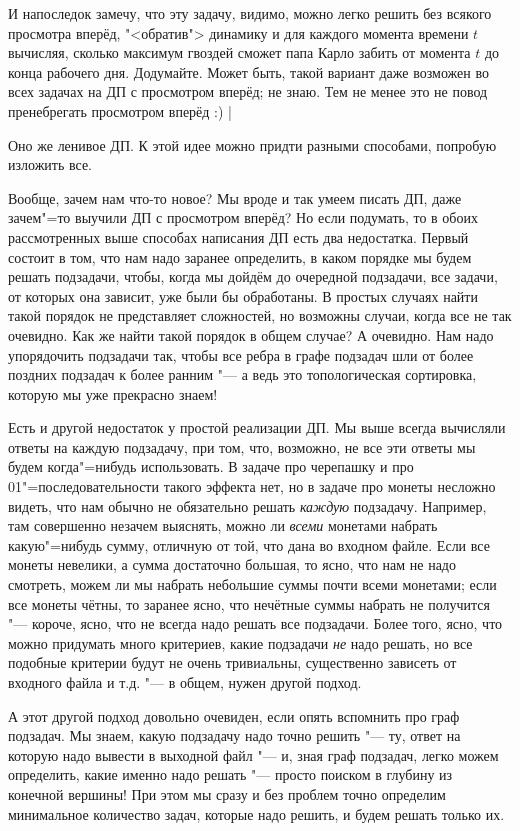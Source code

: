 И напоследок замечу, что эту задачу, видимо, можно легко решить без всякого просмотра вперёд, 
"<обратив"> динамику и для каждого момента времени $t$ вычисляя, сколько максимум гвоздей сможет 
папа Карло забить от момента $t$ до конца рабочего дня. Додумайте. Может быть, такой вариант даже 
возможен во всех задачах на ДП с просмотром вперёд; не знаю. Тем не менее это не повод пренебрегать 
просмотром вперёд :)
|\label{buratino}

 Оно же ленивое ДП.
К этой идее можно придти разными способами, попробую изложить все.

Вообще, зачем нам что-то новое? Мы вроде и так умеем писать ДП, даже зачем"=то выучили ДП с 
просмотром вперёд? Но если подумать, то в обоих рассмотренных выше способах написания ДП есть два 
недостатка. Первый состоит в том, что нам надо заранее определить, в каком порядке мы будем решать 
подзадачи, чтобы, когда мы дойдём до очередной подзадачи, все задачи, от которых она зависит, уже 
были бы обработаны. В простых случаях найти такой порядок не представляет сложностей, но возможны 
случаи, когда все не так очевидно. Как же найти такой порядок в общем случае? А очевидно. Нам надо 
упорядочить подзадачи так, чтобы все ребра в графе подзадач шли от более поздних подзадач к более 
ранним "--- а ведь это топологическая сортировка, которую мы уже прекрасно знаем!

Есть и другой недостаток у простой реализации ДП. Мы выше всегда вычисляли ответы на каждую подзадачу, при том, что, возможно, не все эти ответы мы будем когда"=нибудь использовать. В задаче про черепашку и про 01"=последовательности такого эффекта нет, но в задаче про монеты несложно видеть, что нам обычно не обязательно решать \textit{каждую} подзадачу. Например, там совершенно незачем выяснять, можно ли \textit{всеми} монетами набрать какую"=нибудь сумму, отличную от той, что дана во входном файле. Если все монеты невелики, а сумма достаточно большая, то ясно, что нам не надо смотреть, можем ли мы набрать небольшие суммы почти всеми монетами; если все монеты чётны, то заранее ясно, что нечётные суммы набрать не получится "--- короче, ясно, что не всегда надо решать все подзадачи. Более того, ясно, что можно придумать много критериев, какие подзадачи \textit{не} надо решать, но все подобные критерии будут не очень тривиальны, существенно зависеть от входного файла и т.д. "--- в общем, нужен другой подход.

А этот другой подход довольно очевиден, если опять вспомнить про граф подзадач. Мы знаем, какую подзадачу надо точно решить "--- ту, ответ на которую надо вывести в выходной файл "--- и, зная граф подзадач, легко можем определить, какие именно надо решать "--- просто поиском в глубину из конечной вершины! При этом мы сразу и без проблем точно определим минимальное количество задач, которые надо решить, и будем решать только их.

